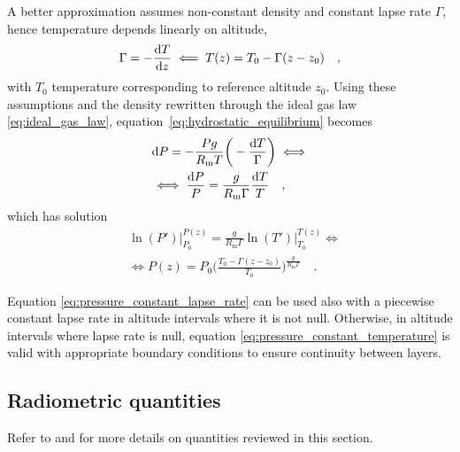 \documentclass[a4paper,10pt,twocolumn,\classoptions]{article}
\begin{document}
A better approximation assumes non-constant density and constant lapse rate $\Gamma$, hence temperature depends linearly on altitude,
\begin{equation}
  \label{eq:constant_lapse_rate}
  \Gamma = - \frac{\odif{T}}{\odif{z}} \impliedby T(z) = T_0 - \Gamma (z - z_0)
  \quad ,
\end{equation}
with $T_0$ temperature corresponding to reference altitude $z_0$. Using these assumptions and the density rewritten through the ideal gas law \eqref{eq:ideal_gas_law}, equation~\eqref{eq:hydrostatic_equilibrium} becomes
\begin{equation}
  \label{eq:hydrostatic_equilibrium_ideal_gas_law_constant_lapse_rate}
  \begin{split}
    & \odif{P} = - \frac{P g}{R_\text{m} T} \bigg( - \frac{\odif{T}}{\Gamma} \bigg) \iff \\
    & \iff \frac{\odif{P}}{P} = \frac{g}{R_\text{m} \Gamma} \frac{\odif{T}}{T}
    \quad ,
  \end{split}
\end{equation}
which has solution
\begin{equation}
  \label{eq:pressure_constant_lapse_rate}
  \begin{split}
    & \ln(P') \bigg|_{P_0}^{P(z)} = \frac{g}{R_\text{m} \Gamma} \ln(T') \bigg|_{T_0}^{T(z)} \iff \\
    & \iff P(z) = P_0 \bigg( \frac{T_0 - \Gamma (z - z_0)}{T_0} \bigg)^\frac{g}{R_\text{m} \Gamma}
    \quad .
  \end{split}
\end{equation}

Equation \eqref{eq:pressure_constant_lapse_rate} can be used also with a piecewise constant lapse rate in altitude intervals where it is not null. Otherwise, in altitude intervals where lapse rate is null, equation \eqref{eq:pressure_constant_temperature} is valid with appropriate boundary conditions to ensure continuity between layers.



\subsection{Radiometric quantities}
\label{sec:Radiometric quantities}
Refer to \cite{CIE} and \cite{Modest} for more details on quantities reviewed in this section.
\end{document}
